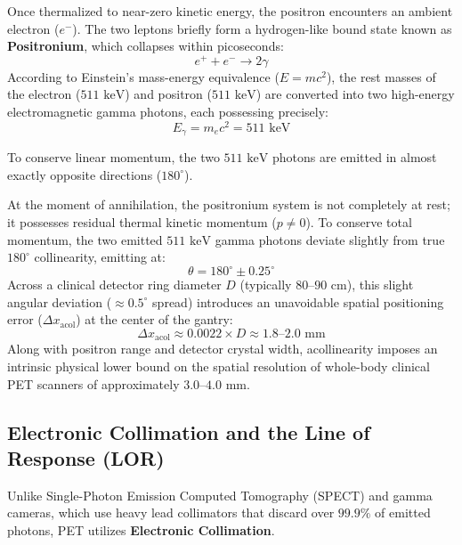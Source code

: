 \documentclass[11pt,a4paper]{article}
\begin{document}
Once thermalized to near-zero kinetic energy, the positron encounters an ambient electron ($e^-$). The two leptons briefly form a hydrogen-like bound state known as \textbf{Positronium}, which collapses within picoseconds:
\begin{equation}
    e^+ + e^- \to 2\gamma
\end{equation}
According to Einstein's mass-energy equivalence ($E = mc^2$), the rest masses of the electron ($511\text{ keV}$) and positron ($511\text{ keV}$) are converted into two high-energy electromagnetic gamma photons, each possessing precisely:
\begin{equation}
    E_\gamma = m_e c^2 = 511\text{ keV}
\end{equation}

To conserve linear momentum, the two $511\text{ keV}$ photons are emitted in almost exactly opposite directions ($180^\circ$).

\begin{physicsoverview}
At the moment of annihilation, the positronium system is not completely at rest; it possesses residual thermal kinetic momentum ($p \ne 0$). To conserve total momentum, the two emitted $511\text{ keV}$ gamma photons deviate slightly from true $180^\circ$ collinearity, emitting at:
\begin{equation}
    \theta = 180^\circ \pm 0.25^\circ
\end{equation}
Across a clinical detector ring diameter $D$ (typically $80\text{--}90\text{ cm}$), this slight angular deviation ($\approx 0.5^\circ$ spread) introduces an unavoidable spatial positioning error ($\Delta x_{\text{acol}}$) at the center of the gantry:
\begin{equation}
    \Delta x_{\text{acol}} \approx 0.0022 \times D \approx 1.8\text{--}2.0\text{ mm}
\end{equation}
Along with positron range and detector crystal width, acollinearity imposes an intrinsic physical lower bound on the spatial resolution of whole-body clinical PET scanners of approximately $3.0\text{--}4.0\text{ mm}$.
\end{physicsoverview}

\subsection{Electronic Collimation and the Line of Response (LOR)}
Unlike Single-Photon Emission Computed Tomography (SPECT) and gamma cameras, which use heavy lead collimators that discard over $99.9\%$ of emitted photons, PET utilizes \textbf{Electronic Collimation}.
\end{document}
